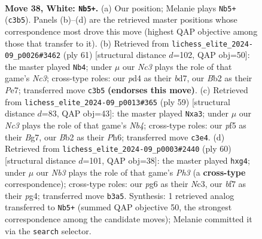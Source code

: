 \documentclass[11pt]{article}
\begin{document}
\clearpage

\begin{figure}[p]\centering
\begin{subfigure}{0.46\textwidth}\centering
\resizebox{\linewidth}{!}{%
\newchessgame
\chessboard[
  setfen={rn1b2r1/1pk2b1p/6pP/p3Pp2/P2p4/1NN3P1/1B5K/R2R4 w - - 0 38},
  showmover=false,
  pgfstyle=straightmove, color=movearrow, markmove={c3-b5}
]}
\caption{}
\end{subfigure}\hfill
\begin{subfigure}{0.46\textwidth}\centering
\resizebox{\linewidth}{!}{%
\newchessgame
\chessboard[
  setfen={1r1r2k1/3Bpp1p/1bn3pB/p3P3/P4P2/3R2PP/8/3R3K b - - 1 31},
  showmover=false,
  pgfstyle=straightmove, color=movearrow, markmove={c6-b4}
]}
\caption{}
\end{subfigure}
\\[4pt]
\begin{subfigure}{0.46\textwidth}\centering
\resizebox{\linewidth}{!}{%
\newchessgame
\chessboard[
  setfen={rr4k1/3n1pb1/3p2pp/1npP4/4P3/N3P1PP/RP3PK1/R3BB2 b - - 0 30},
  showmover=false,
  pgfstyle=straightmove, color=movearrow, markmove={b5-a3}
]}
\caption{}
\end{subfigure}\hfill
\begin{subfigure}{0.46\textwidth}\centering
\resizebox{\linewidth}{!}{%
\newchessgame
\chessboard[
  setfen={3kr3/p2bn1p1/1pp2p2/5P2/P3R1p1/1PN4P/2P1R3/2K5 w - - 0 31},
  showmover=false,
  pgfstyle=straightmove, color=movearrow, markmove={h3-g4}
]}
\caption{}
\end{subfigure}
\caption{\textbf{Move 38, White: \texttt{Nb5+}.} (a) Our position; Melanie plays \texttt{Nb5+} (\texttt{c3b5}). Panels (b)--(d) are the retrieved master positions whose correspondence most drove this move (highest QAP objective among those that transfer to it). (b) Retrieved from \texttt{lichess\_elite\_2024-09\_p0026\#3462} (ply 61) [structural distance $d$=102, QAP obj=50]: the master played \texttt{Nb4}; under $\mu$ our \emph{Nc3} plays the role of that game's \emph{Nc3}; cross-type roles: our \emph{p}d4 as their \emph{b}d7, our \emph{B}b2 as their \emph{P}e7; transferred move \texttt{c3b5} \textbf{(endorses this move)}. (c) Retrieved from \texttt{lichess\_elite\_2024-09\_p0013\#365} (ply 59) [structural distance $d$=83, QAP obj=43]: the master played \texttt{Nxa3}; under $\mu$ our \emph{Nc3} plays the role of that game's \emph{Nb4}; cross-type roles: our \emph{p}f5 as their \emph{B}g7, our \emph{B}b2 as their \emph{P}h6; transferred move \texttt{c3e4}. (d) Retrieved from \texttt{lichess\_elite\_2024-09\_p0003\#2440} (ply 60) [structural distance $d$=101, QAP obj=38]: the master played \texttt{hxg4}; under $\mu$ our \emph{Nb3} plays the role of that game's \emph{Ph3} (a \textbf{cross-type} correspondence); cross-type roles: our \emph{p}g6 as their \emph{N}c3, our \emph{b}f7 as their \emph{p}g4; transferred move \texttt{b3a5}. Synthesis: 1 retrieved analog transferred to \texttt{Nb5+} (summed QAP objective 50, the strongest correspondence among the candidate moves); Melanie committed it via the \texttt{search} selector.}
\label{fig:thought-m74}
\end{figure}
\end{document}
